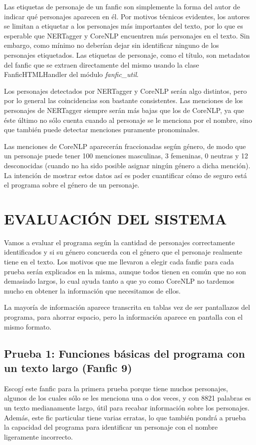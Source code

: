 \documentclass{pre-tfg}
\begin{document}
Las etiquetas de personaje de un fanfic son simplemente la forma del autor de indicar qué personajes aparecen en él. Por motivos técnicos evidentes, los autores se limitan a etiquetar a los personajes más importantes del texto, por lo que es esperable que NERTagger y CoreNLP encuentren más personajes en el texto. Sin embargo, como mínimo no deberían dejar sin identificar ninguno de los personajes etiquetados.
Las etiquetas de personaje, como el título, son metadatos del fanfic que se extraen directamente del mismo usando la clase FanficHTMLHandler del módulo \textit{fanfic\_util}.

Los personajes detectados por NERTagger y CoreNLP serán algo distintos, pero por lo general las coincidencias son bastante consistentes. Las menciones de los personajes de NERTagger siempre serán más bajas que los de CoreNLP, ya que éste último no sólo cuenta cuando al personaje se le menciona por el nombre, sino que también puede detectar menciones puramente pronominales.

Las menciones de CoreNLP aparecerán fraccionadas según género, de modo que un personaje puede tener 100 menciones masculinas, 3 femeninas, 0 neutras y 12 desconocidas (cuando no ha sido posible asignar ningún género a dicha mención). La intención de mostrar estos datos así es poder cuantificar cómo de seguro está el programa sobre el género de un personaje.



\cleardoublepage
\section{EVALUACIÓN DEL SISTEMA}
\label{sec:evaluacion}

Vamos a evaluar el programa según la cantidad de personajes correctamente identificados y si su género concuerda con el género que el personaje realmente tiene en el texto. Los motivos que me llevaron a elegir cada fanfic para cada prueba serán explicados en la misma, aunque todos tienen en común que no son demasiado largos, lo cual ayuda tanto a que yo como CoreNLP no tardemos mucho en obtener la información que necesitamos de ellos.

La mayoría de información aparece transcrita en tablas vez de ser pantallazos del programa, para ahorrar espacio, pero la información aparece en pantalla con el mismo formato.

\subsection{Prueba 1: Funciones básicas del programa con un texto largo (Fanfic 9)}
Escogí este fanfic para la primera prueba porque tiene muchos personajes, algunos de los cuales sólo se les menciona una o dos veces, y con 8821 palabras es un texto medianamente largo, útil para recabar información sobre los personajes. Además, este fic particular tiene varias erratas, lo que también pondrá a prueba la capacidad del programa para identificar un personaje con el nombre ligeramente incorrecto.
\end{document}
